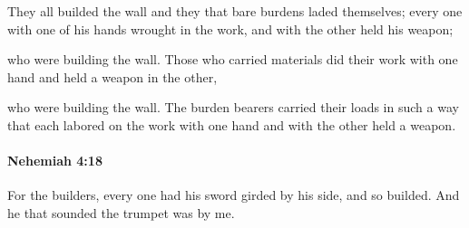 			\begin{versebox}
					\item[BHS] 
					\item[LXX] 
					\item[ASV] They all builded the wall and they that bare burdens laded themselves; every one with one of his hands wrought in the work, and with the other held his weapon;
					\item[NIV] who were building the wall. Those who carried materials did their work with one hand and held a weapon in the other,
					\item[NRSV] who were building the wall. The burden bearers carried their loads in such a way that each labored on the work with one hand and with the other held a weapon.
			\end{versebox}

		\paragraph{Nehemiah 4:18} %
			\label{NEHEMIAH-4-18}

			For the builders, every one had his sword girded by his side, and so builded. And he that sounded the trumpet was by me.

